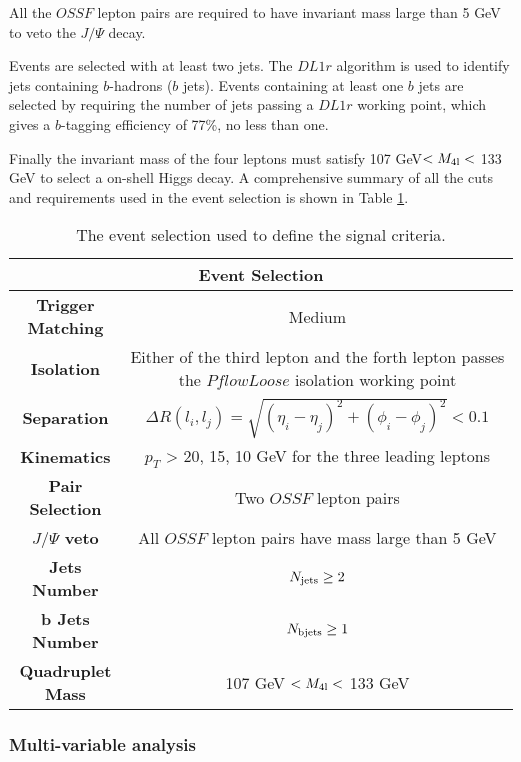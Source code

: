 All the $OSSF$ lepton pairs are required to have invariant mass large than 5 GeV to veto the $J/\Psi$ decay.

Events are selected with at least two jets. The $DL1r$ algorithm is used to identify jets containing $b$-hadrons ($b$ jets). Events containing at least one $b$ jets are selected by requiring the number of jets passing a $DL1r$ working point, which gives a $b$-tagging efficiency of 77\%, no less than one.

Finally the invariant mass of the four leptons must satisfy 107 GeV$<M_{\rm 4l}<$ 133 GeV to select a on-shell Higgs decay. A comprehensive summary of all the cuts and requirements used in the event selection is shown in Table \ref{Tab.pre-selection}.

\begin{table}[H]
\begin{center}
\caption{The event selection used to define the signal criteria.}
\label{Tab.pre-selection}
\begin{tabular}{cc}
	\toprule
	\toprule	
	\multicolumn{2}{c}{\textbf{Event Selection}}\\
	\midrule
	\textbf{Trigger Matching}&Medium\\
	\midrule
	\textbf{Isolation}&\makecell[c]{Either of the third lepton and the forth lepton\\ passes the $PflowLoose$ isolation working point}\\
	\midrule
	\textbf{Separation}&$\Delta{R}(l_{i},l_{j})=\sqrt{(\eta_{i}-\eta_{j})^{2}+(\phi_{i}-\phi_{j})^{2}}<0.1$\\
	\midrule
	\textbf{Kinematics}&$p_{T}$ > 20, 15, 10 GeV for the three leading leptons\\
	\midrule
	\textbf{Pair Selection}&Two $OSSF$ lepton pairs\\
	\midrule
	\textbf{$J/\Psi$ veto}&All $OSSF$ lepton pairs have mass large than 5 GeV\\
	\midrule
	\textbf{Jets Number}&$N_{\rm jets}\ge{2}$\\
	\midrule
	\textbf{b Jets Number}&$N_{\rm b jets}\ge{1}$\\
	\midrule
	\textbf{Quadruplet Mass}&107 GeV $<M_{\rm 4l}<$ 133 GeV\\
	\bottomrule
	\bottomrule
\end{tabular}
\end{center}
\end{table}

\subsubsection{Multi-variable analysis}
\label{subsubsec:mva}

